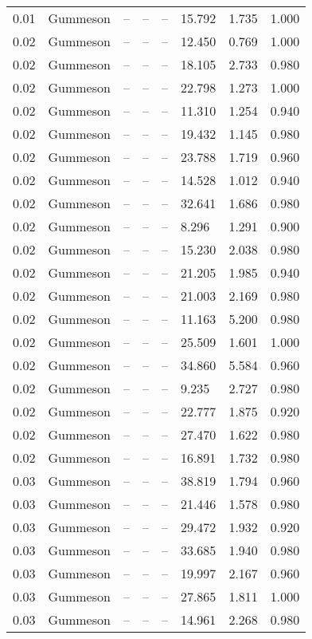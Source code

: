 \begin{table}[H]
\begin{tabular}{l c l l l}
0.01 & Gummeson & -- & -- & -- & 15.792 & 1.735 & 1.000 \\
0.02 & Gummeson & -- & -- & -- & 12.450 & 0.769 & 1.000 \\
0.02 & Gummeson & -- & -- & -- & 18.105 & 2.733 & 0.980 \\
0.02 & Gummeson & -- & -- & -- & 22.798 & 1.273 & 1.000 \\
0.02 & Gummeson & -- & -- & -- & 11.310 & 1.254 & 0.940 \\
0.02 & Gummeson & -- & -- & -- & 19.432 & 1.145 & 0.980 \\
0.02 & Gummeson & -- & -- & -- & 23.788 & 1.719 & 0.960 \\
0.02 & Gummeson & -- & -- & -- & 14.528 & 1.012 & 0.940 \\
0.02 & Gummeson & -- & -- & -- & 32.641 & 1.686 & 0.980 \\
0.02 & Gummeson & -- & -- & -- & 8.296 & 1.291 & 0.900 \\
0.02 & Gummeson & -- & -- & -- & 15.230 & 2.038 & 0.980 \\
0.02 & Gummeson & -- & -- & -- & 21.205 & 1.985 & 0.940 \\
0.02 & Gummeson & -- & -- & -- & 21.003 & 2.169 & 0.980 \\
0.02 & Gummeson & -- & -- & -- & 11.163 & 5.200 & 0.980 \\
0.02 & Gummeson & -- & -- & -- & 25.509 & 1.601 & 1.000 \\
0.02 & Gummeson & -- & -- & -- & 34.860 & 5.584 & 0.960 \\
0.02 & Gummeson & -- & -- & -- & 9.235 & 2.727 & 0.980 \\
0.02 & Gummeson & -- & -- & -- & 22.777 & 1.875 & 0.920 \\
0.02 & Gummeson & -- & -- & -- & 27.470 & 1.622 & 0.980 \\
0.02 & Gummeson & -- & -- & -- & 16.891 & 1.732 & 0.980 \\
0.03 & Gummeson & -- & -- & -- & 38.819 & 1.794 & 0.960 \\
0.03 & Gummeson & -- & -- & -- & 21.446 & 1.578 & 0.980 \\
0.03 & Gummeson & -- & -- & -- & 29.472 & 1.932 & 0.920 \\
0.03 & Gummeson & -- & -- & -- & 33.685 & 1.940 & 0.980 \\
0.03 & Gummeson & -- & -- & -- & 19.997 & 2.167 & 0.960 \\
0.03 & Gummeson & -- & -- & -- & 27.865 & 1.811 & 1.000 \\
0.03 & Gummeson & -- & -- & -- & 14.961 & 2.268 & 0.980 \\

\end{tabular}
\end{table}
